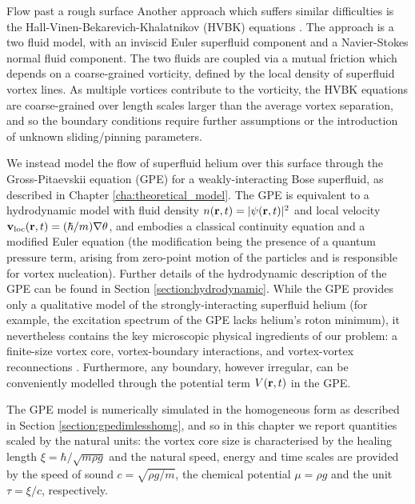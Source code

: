 \begin{chapter}{\label{cha:afm}Flow past a rough surface}
Another approach which suffers similar difficulties \cite{Henderson} is
the Hall-Vinen-Bekarevich-Khalatnikov (HVBK)
equations \cite{Salort2011,Salort2012}. The approach is a two fluid model, with an inviscid Euler superfluid component and a Navier-Stokes normal fluid component. The two fluids are coupled via a mutual friction which depends on a coarse-grained vorticity, defined by the local density of superfluid vortex lines. As multiple vortices contribute to the vorticity, the HVBK equations are coarse-grained over length scales larger than the average vortex separation, and so the boundary conditions require further assumptions or the introduction of
unknown sliding/pinning parameters.


We instead model the flow of superfluid helium over this surface through the Gross-Pitaevskii equation (GPE) \cite{RobertsBerloff} for a weakly-interacting Bose superfluid, as described in Chapter \ref{cha:theoretical_model}. The GPE is equivalent to a hydrodynamic model with fluid density $n({\bf r},t)=|\psi({\bf r},t)|^2$ and local velocity ${\bf v}_{\rm loc}({\bf r},t)=(\hbar/m)\nabla \theta$, and embodies a classical 
continuity equation and a modified Euler equation (the modification being the presence of a quantum pressure term, arising from zero-point motion of the particles {and is responsible for vortex nucleation}). Further details of the hydrodynamic description of the GPE can be found in Section \ref{section:hydrodynamic}.
While the GPE provides only a qualitative model of the strongly-interacting superfluid helium (for example, the excitation spectrum of the GPE lacks helium's roton minimum), it nevertheless contains the key microscopic physical ingredients of our problem: a finite-size vortex core, vortex-boundary interactions, and vortex-vortex reconnections \cite{RobertsBerloff}.  Furthermore, any boundary, however irregular, can be conveniently modelled through the potential term $V({\bf r},t)$ in the GPE.

The GPE model is numerically simulated in the homogeneous form as described in Section \ref{section:gpedimlesshomg}, and so in this chapter we report quantities scaled by the natural units: the vortex core size is characterised by the healing length $\xi=\hbar/\sqrt{m \rho g}$ and the natural speed, energy and time scales are provided by the speed of sound $c=\sqrt{\rho g/m}$, the chemical potential $\mu=\rho g$ and the unit $\tau=\xi/c$, respectively. 


\end{chapter}

